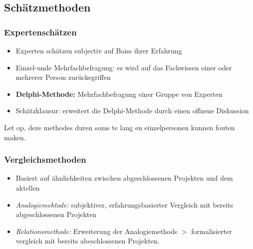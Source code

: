 \documentclass[11pt,a4paper]{article}
\begin{document}
\subsection{Schätzmethoden}
\begin{minipage}[t]{0.5\textwidth}

\subsubsection{Expertenschätzen}
\begin{itemize}
	\item Experten schätzen subjectiv auf Baiss ihrer Erfahrung
	\item Einzel-unde Mehrfachbefragung: es wird auf das Fachwissen einer oder mehrerer Person zurückegriffen
	\item \textbf{Delphi-Methode:} Mehrfachbefragung einer Gruppe von Experten
	\item Schätzklausur: erweitert die Delphi-Methode durch einen offnene Diskussion
\end{itemize}

Let op, deze methodes duren soms te lang en einzelpersonen kunnen fouten maken.

\subsubsection{Vergleichsmethoden}

\begin{itemize}
	\item Basiert auf ähnlichkeiten zwischen abgeschlossenen Projekten und dem aktellen
	\item \textit{Analogiemehtode:} subjektiver, erfahrungsbasierter Vergleich mit bereits abgeschlossenen Projekten
	\item \textit{Relationsmethode:} Erweiterung der Analogiemethods $>$ formalisierter vergleich mit bereits abeschlossenen Projekten.
\end{itemize}

\end{minipage}
~
\end{document}
